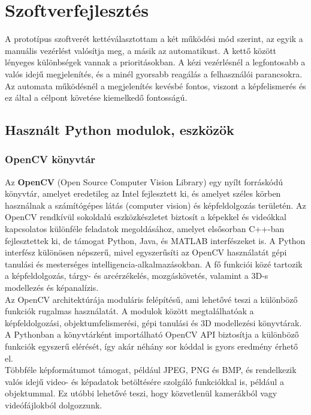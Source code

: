 \chapter{Szoftverfejlesztés}
A prototípus szoftverét kettéválasztottam a két működési mód szerint, az egyik a manuális vezérlést valósítja meg, a másik az automatikust. A kettő között lényeges különbségek vannak a prioritásokban. A kézi vezérlésnél a legfontosabb a valós idejű megjelenítés, és a minél gyorsabb reagálás a felhasználói parancsokra. Az automata működésnél a megjelenítés kevésbé fontos, viszont a képfelismerés és ez által a célpont követése kiemelkedő fontosságú.


\section{Használt Python modulok, eszközök}
\subsection*{OpenCV könyvtár \cite{opencv}}
Az \textbf{OpenCV} (Open Source Computer Vision Library) egy nyílt forráskódú könyvtár, amelyet eredetileg az Intel fejlesztett ki, és amelyet széles körben használnak a számítógépes látás (computer vision) és képfeldolgozás területén. Az OpenCV rendkívül sokoldalú eszközkészletet biztosít a képekkel és videókkal kapcsolatos különféle feladatok megoldásához, amelyet elsősorban C++-ban fejlesztettek ki, de támogat Python, Java, és MATLAB interfészeket is. A Python interfész különösen népszerű, mivel egyszerűsíti az OpenCV használatát gépi tanulási és mesterséges intelligencia-alkalmazásokban. A fő funkciói közé tartozik a képfeldolgozás, tárgy- és arcérzékelés, mozgáskövetés, valamint a 3D-s modellezés és képanalízis.\\

Az OpenCV architektúrája moduláris felépítésű, ami lehetővé teszi a különböző funkciók rugalmas használatát. A modulok között megtalálhatóak a képfeldolgozási, objektumfelismerési, gépi tanulási és 3D modellezési könyvtárak. A Pythonban a  könyvtárként importálható OpenCV API biztosítja a különböző funkciók egyszerű elérését, így akár néhány sor kóddal is gyors eredmény érhető el.\\

Többféle képformátumot támogat, például JPEG, PNG és BMP, és rendelkezik valós idejű video- és képadatok betöltésére szolgáló funkciókkal is, például a  objektummal. Ez utóbbi lehetővé teszi, hogy közvetlenül kamerákból vagy videófájlokból dolgozzunk.\\

